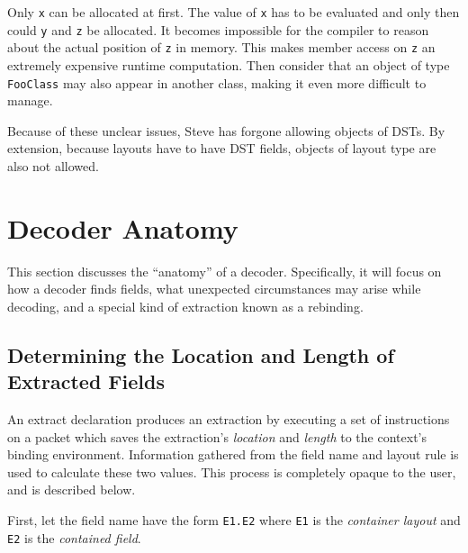 Only \texttt{x} can be allocated at first. The value of \texttt{x} has to be evaluated
and only then could \texttt{y} and \texttt{z} be allocated. It becomes impossible
for the compiler to reason about the actual position of \texttt{z} in memory. This 
makes member access on \texttt{z} an extremely expensive runtime computation.
Then consider that an object of type \texttt{FooClass} may also appear in
another class, making it even more difficult to manage.

Because of these unclear issues, Steve has forgone allowing objects of DSTs.
By extension, because layouts have to have DST fields, objects of layout type
are also not allowed.


\section{Decoder Anatomy} \label{decoder_anatomy}

This section discusses the ``anatomy'' of a decoder.
Specifically, it will focus on how a decoder finds fields, what unexpected circumstances
may arise while decoding, and a special kind of extraction known
as a rebinding.

\subsection{Determining the Location and Length of Extracted Fields}

An extract declaration produces an extraction by executing a set of instructions on a packet which saves the extraction's \textit{location} and \textit{length} to the context's binding environment. Information gathered from the field name and layout rule is used to calculate these two values. This process is completely opaque to the user, and is described below.

First, let the field name have the form \texttt{E1.E2} where \texttt{E1} is the \textit{container layout} and \texttt{E2} is the \textit{contained field}.

